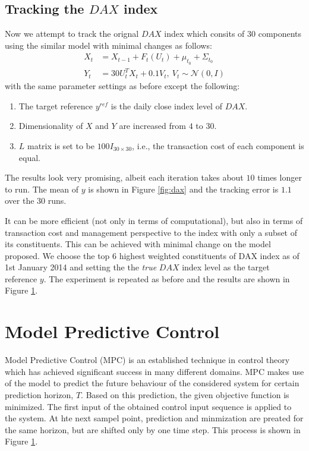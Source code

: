 \subsection{Tracking the $DAX$ index}
Now we attempt to track the orignal $DAX$ index which consits of $30$ components using the similar model with minimal changes as follows:
\begin{align}
  X_t &= X_{t-1} + F_t(U_t) + \mu_{t_0} + \Sigma_{t_0} \\
  Y_t &= 30U^T_tX_t + 0.1V_t,~V_t \sim \mathcal{N}(0, I)
\end{align}
with the same parameter settings as before except the following:
\begin{enumerate}
\item The target reference $y^{ref}$ is the daily close index level of $DAX$.
\item Dimensionality of $X$ and $Y$ are increased from $4$ to $30$.
\item $L$ matrix is set to be $100I_{30 \times 30}$, i.e., the transaction cost of each component is equal.
\end{enumerate}
The results look very promising, albeit each iteration takes about $10$ times longer to run. The mean of $y$ is shown in Figure \ref{fig:dax} and the tracking error is $1.1$ over the $30$ runs.
 
It can be more efficient (not only in terms of computational), but also in terms of transaction cost and management perspective to the index with only a subset of its constituents. This can be achieved with minimal change on the model proposed. We choose the top $6$ highest weighted constituents of DAX index as of 1st January 2014 and setting the the \emph{true} $DAX$ index level as the target reference $y$. The experiment is repeated as before and the results are shown in Figure \ref{}.
 
\section{Model Predictive Control}
Model Predictive Control (MPC) is an established technique in control theory which has achieved significant success in many different domains. MPC makes use of the model to predict the future behaviour of the considered system for certain prediction horizon, $T$. Based on this prediction, the given objective function is minimized. The first input of the obtained control input sequence is applied to the system. At hte next sampel point, prediction and minmization are preated for the same horizon, but are shifted only by one time step. This process is shown in Figure \ref{}. 

